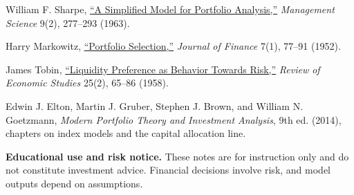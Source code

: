 \documentclass[11pt]{article}
\begin{document}
\begin{readinglist}
  \item William F. Sharpe, \href{https://doi.org/10.1287/mnsc.9.2.277}{``A Simplified Model for Portfolio Analysis,''} \emph{Management Science} 9(2), 277--293 (1963).
  \item Harry Markowitz, \href{https://www.jstor.org/stable/2975974}{``Portfolio Selection,''} \emph{Journal of Finance} 7(1), 77--91 (1952).
  \item James Tobin, \href{https://doi.org/10.2307/2296205}{``Liquidity Preference as Behavior Towards Risk,''} \emph{Review of Economic Studies} 25(2), 65--86 (1958).
  \item Edwin J. Elton, Martin J. Gruber, Stephen J. Brown, and William N. Goetzmann, \emph{Modern Portfolio Theory and Investment Analysis}, 9th ed. (2014), chapters on index models and the capital allocation line.
\end{readinglist}

\vfill
{\sffamily\footnotesize\color{vnmuted}\textbf{Educational use and risk notice.} These notes are for instruction only and do not constitute investment advice. Financial decisions involve risk, and model outputs depend on assumptions.}
\end{document}
